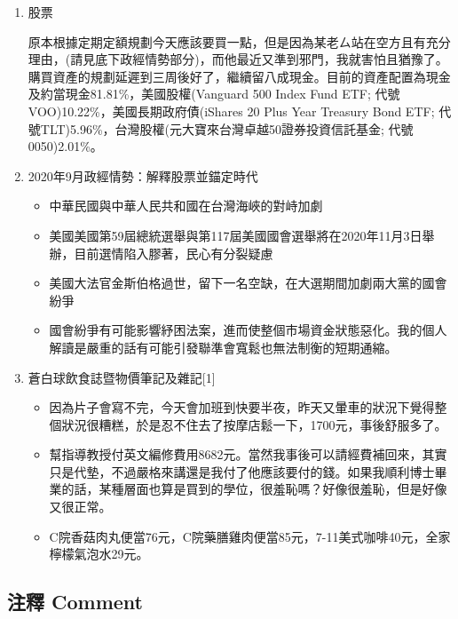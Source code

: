 \documentclass[a5paper, 11pt
]{book}
\providecommand{\tightlist}{%
  \setlength{\itemsep}{0pt}\setlength{\parskip}{0pt}}
\begin{document}
\begin{enumerate}
\def\labelenumi{\arabic{enumi}.}
\item
  股票

  原本根據定期定額規劃今天應該要買一點，但是因為某老ㄙ站在空方且有充分理由，(請見底下政經情勢部分)，而他最近又準到邪門，我就害怕且猶豫了。購買資產的規劃延遲到三周後好了，繼續留八成現金。目前的資產配置為現金及約當現金81.81\%，美國股權(Vanguard
  500 Index Fund ETF; 代號VOO)10.22\%，美國長期政府債(iShares 20 Plus
  Year Treasury Bond ETF;
  代號TLT)5.96\%，台灣股權(元大寶來台灣卓越50證券投資信託基金;
  代號0050)2.01\%。
\item
  2020年9月政經情勢：解釋股票並錨定時代

  \begin{itemize}
  \tightlist
  \item
    中華民國與中華人民共和國在台灣海峽的對峙加劇
  \item
    美國美國第59屆總統選舉與第117屆美國國會選舉將在2020年11月3日舉辦，目前選情陷入膠著，民心有分裂疑慮
  \item
    美國大法官金斯伯格過世，留下一名空缺，在大選期間加劇兩大黨的國會紛爭
  \item
    國會紛爭有可能影響紓困法案，進而使整個市場資金狀態惡化。我的個人解讀是嚴重的話有可能引發聯準會寬鬆也無法制衡的短期通縮。
  \end{itemize}
\item
  蒼白球飲食誌暨物價筆記及雜記{[}1{]}

  \begin{itemize}
  \tightlist
  \item
    因為片子會寫不完，今天會加班到快要半夜，昨天又暈車的狀況下覺得整個狀況很糟糕，於是忍不住去了按摩店鬆一下，1700元，事後舒服多了。
  \item
    幫指導教授付英文編修費用8682元。當然我事後可以請經費補回來，其實只是代墊，不過嚴格來講還是我付了他應該要付的錢。如果我順利博士畢業的話，某種層面也算是買到的學位，很羞恥嗎？好像很羞恥，但是好像又很正常。
  \item
    C院香菇肉丸便當76元，C院藥膳雞肉便當85元，7-11美式咖啡40元，全家檸檬氣泡水29元。
  \end{itemize}
\end{enumerate}

\hypertarget{ux6ce8ux91cb-comment-21}{%
\subsection{注釋 Comment}\label{ux6ce8ux91cb-comment-21}}
\end{document}
